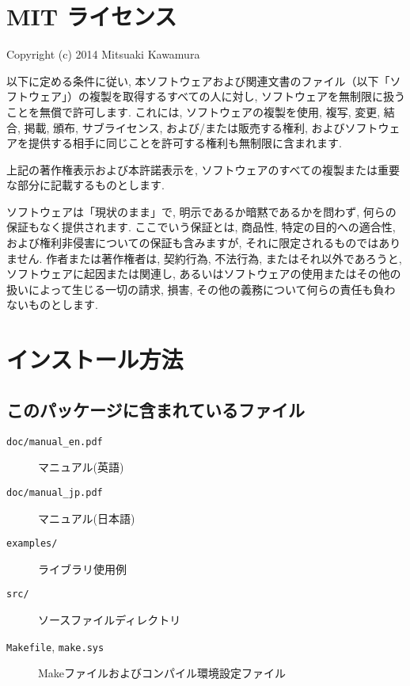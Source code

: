 \documentclass[12pt]{jarticle}
\begin{document}
\section{MIT ライセンス}

Copyright (c) 2014 Mitsuaki Kawamura

\vspace{0.5cm}
以下に定める条件に従い, 
本ソフトウェアおよび関連文書のファイル（以下「ソフトウェア」）の複製を取得するすべての人に対し, 
ソフトウェアを無制限に扱うことを無償で許可します. 
これには, ソフトウェアの複製を使用, 複写, 変更, 結合, 掲載, 頒布, サブライセンス, 
および/または販売する権利, およびソフトウェアを提供する相手に同じことを許可する権利も無制限に含まれます. 

\vspace{0.5cm}
上記の著作権表示および本許諾表示を, ソフトウェアのすべての複製または重要な部分に記載するものとします. 

\vspace{0.5cm}
ソフトウェアは「現状のまま」で, 明示であるか暗黙であるかを問わず, 何らの保証もなく提供されます. 
ここでいう保証とは, 商品性, 特定の目的への適合性, および権利非侵害についての保証も含みますが, 
それに限定されるものではありません.  作者または著作権者は, 契約行為, 不法行為, またはそれ以外であろうと, 
ソフトウェアに起因または関連し, あるいはソフトウェアの使用またはその他の扱いによって生じる一切の請求, 損害, 
その他の義務について何らの責任も負わないものとします.  

\section{インストール方法}

\subsection{このパッケージに含まれているファイル}
\begin{description}
\item[\texttt{doc/manual\_en.pdf}] マニュアル(英語)
\item[\texttt{doc/manual\_jp.pdf}] マニュアル(日本語)
\item[\texttt{examples/}] ライブラリ使用例 
\item[\texttt{src/}] ソースファイルディレクトリ
\item[\texttt{Makefile}, \texttt{make.sys}] Makeファイルおよびコンパイル環境設定ファイル
\end{description}
\end{document}
